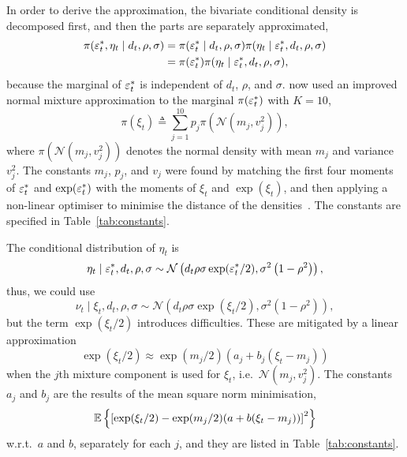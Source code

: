 In order to derive the approximation, the bivariate conditional density is decomposed first, and then the parts are separately approximated,
\begin{align}
\pi(\varepsilon_t^\ast,\eta_t\mid d_t,\rho,\sigma) &= \pi(\varepsilon_t^\ast\mid d_t,\rho,\sigma) \pi(\eta_t\mid\varepsilon_t^\ast,d_t,\rho,\sigma)\nonumber \\
&= \pi(\varepsilon_t^\ast) \pi(\eta_t\mid\varepsilon_t^\ast,d_t,\rho,\sigma)\label{eq:decomp},
\end{align}
because the marginal of $\varepsilon_t^\ast$ is independent of $d_t$, $\rho$, and $\sigma$.
\citet{Omori2007} now used an improved normal mixture approximation to the marginal $\pi(\varepsilon_t^\ast)$ with $K=10$,
\begin{equation}\label{eq:ets}
\pi(\xi_t)\triangleq\sum_{j=1}^{10}p_j\pi\left(\mathcal{N}\left(m_j,v_j^2\right)\right),
\end{equation}
where $\pi\left(\mathcal{N}\left(m_j,v_j^2\right)\right)$ denotes the normal density with mean $m_j$ and variance $v_j^2$.
The constants $m_j$, $p_j$, and $v_j$ were found by matching the first four moments of $\varepsilon_t^\ast$ and $\exp(\varepsilon_t^\ast)$ with the moments of $\xi_t$ and $\exp(\xi_t)$, and then applying a non-linear optimiser to minimise the distance of the densities~\citep{Kim1998}.
The constants are specified in Table~\ref{tab:constants}.

The conditional distribution of $\eta_t$ is
\begin{equation*}
\eta_t\mid\varepsilon_t^\ast,d_t,\rho,\sigma\sim\mathcal{N}\left(d_t\rho\sigma\exp(\varepsilon_t^\ast/2),\sigma^2\left(1-\rho^2\right)\right),
\end{equation*}
thus, we could use
\begin{equation}\label{eq:eta}
\nu_t\mid\xi_t,d_t,\rho,\sigma\sim\mathcal{N}\left(d_t\rho\sigma\exp(\xi_t/2),\sigma^2\left(1-\rho^2\right)\right),
\end{equation}
but the term $\exp(\xi_t/2)$ introduces difficulties.
These are mitigated by a linear approximation
\begin{equation}\label{eq:etslinear}
\exp(\xi_t/2)\approx\exp(m_j/2)(a_j+b_j(\xi_t-m_j))
\end{equation}
when the $j$th mixture component is used for $\xi_t$, i.e.\ $\mathcal{N}(m_j,v_j^2)$.
The constants $a_j$ and $b_j$ are the results of the mean square norm minimisation,
\begin{equation*}
\mathbb{E}\left\{\left[\exp(\xi_t/2)-\exp(m_j/2)(a+b(\xi_t-m_j))\right]^2\right\}
\end{equation*}
w.r.t.\ $a$ and $b$, separately for each $j$, and they are listed in Table~\ref{tab:constants}.

